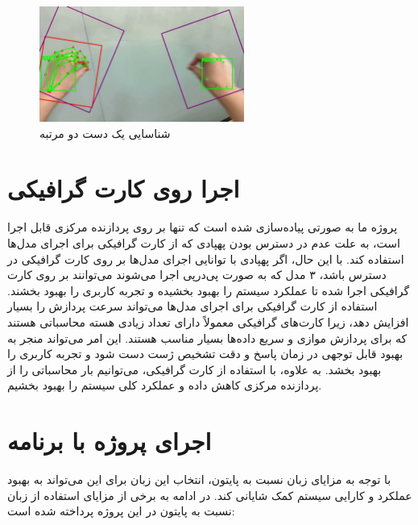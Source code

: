 \begin{figure}[h]
    \centering
    \includegraphics[width=0.6\textwidth]{multi_boxes.png}
    \caption{شناسایی یک دست دو مرتبه}
\end{figure}


\section{اجرا روی کارت گرافیکی \protect{}}
پروژه ما به صورتی پیاده‌سازی شده است که تنها بر روی پردازنده مرکزی قابل اجرا است، به علت عدم در دسترس بودن پهپادی که از کارت گرافیکی برای اجرای مدل‌ها استفاده کند. با این حال، اگر پهپادی با توانایی اجرای مدل‌ها بر روی 
کارت گرافیکی در دسترس باشد، ۳ مدل که به صورت پی‌در‌پی اجرا می‌شوند می‌توانند بر روی کارت گرافیکی اجرا شده تا عملکرد سیستم را بهبود بخشیده و تجربه کاربری را بهبود بخشند. استفاده از کارت گرافیکی برای اجرای مدل‌ها می‌تواند 
سرعت پردازش را بسیار افزایش دهد، زیرا کارت‌های گرافیکی معمولاً دارای تعداد زیادی هسته محاسباتی هستند که برای پردازش موازی و سریع داده‌ها بسیار مناسب هستند. این امر می‌تواند منجر به بهبود قابل توجهی در زمان پاسخ و دقت 
تشخیص ژست دست شود و تجربه کاربری را بهبود بخشد. به علاوه، با استفاده از کارت گرافیکی، می‌توانیم بار محاسباتی را از پردازنده مرکزی کاهش داده و عملکرد کلی سیستم را بهبود بخشیم.

\section{اجرای پروژه با برنامه }
با توجه به مزایای زبان  نسبت به پایتون، انتخاب این زبان برای این می‌تواند به بهبود عملکرد و کارایی سیستم کمک شایانی کند. در ادامه به برخی از مزایای استفاده از زبان  نسبت به پایتون در این پروژه پرداخته شده است:

